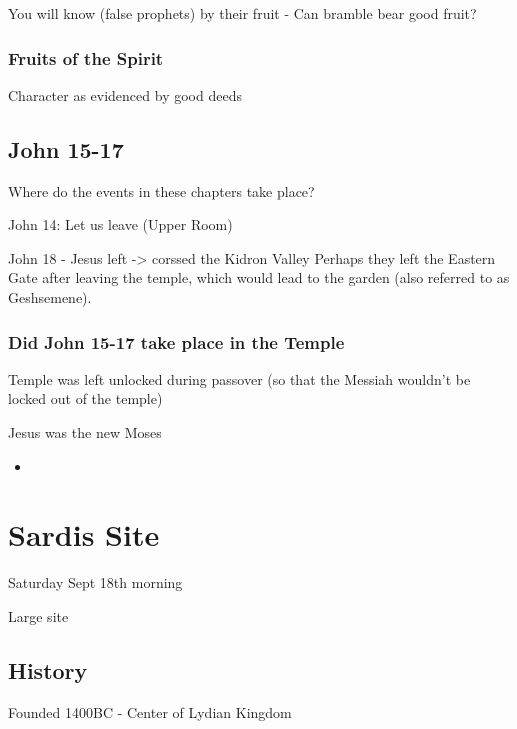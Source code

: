 \documentclass[
]{book}
\providecommand{\tightlist}{%
  \setlength{\itemsep}{0pt}\setlength{\parskip}{0pt}}
\begin{document}
You will know (false prophets) by their fruit - Can bramble bear good fruit?

\hypertarget{fruits-of-the-spirit}{%
\subsection{Fruits of the Spirit}\label{fruits-of-the-spirit}}

Character as evidenced by good deeds

\hypertarget{john-15-17}{%
\section{John 15-17}\label{john-15-17}}

Where do the events in these chapters take place?

John 14: Let us leave (Upper Room)

John 18 - Jesus left -\textgreater{} corssed the Kidron Valley
Perhaps they left the Eastern Gate after leaving the temple, which would lead to the garden (also referred to as Geshsemene).

\hypertarget{did-john-15-17-take-place-in-the-temple}{%
\subsection{Did John 15-17 take place in the Temple}\label{did-john-15-17-take-place-in-the-temple}}

Temple was left unlocked during passover (so that the Messiah wouldn't be locked out of the temple)

Jesus was the new Moses

\begin{itemize}
\tightlist
\item
\end{itemize}

\hypertarget{sardis-site}{%
\chapter{Sardis Site}\label{sardis-site}}

Saturday Sept 18th morning

Large site

\hypertarget{history-2}{%
\section{History}\label{history-2}}

Founded 1400BC - Center of Lydian Kingdom
\end{document}

